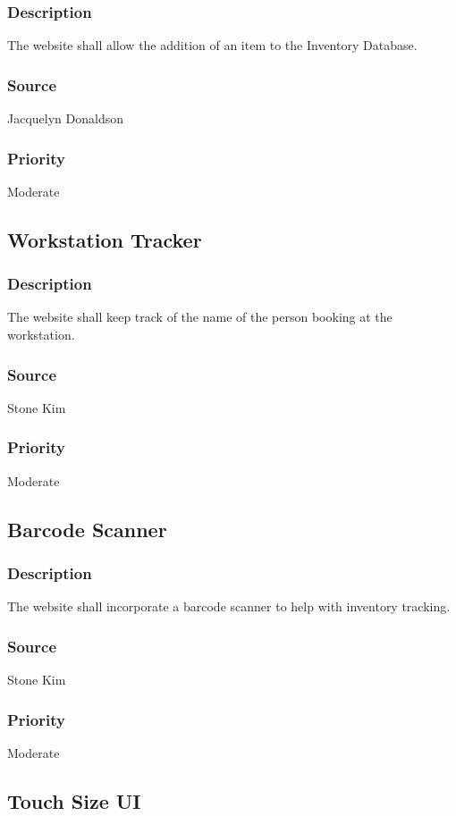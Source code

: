 \subsubsection{Description}
The website shall allow the addition of an item to the Inventory Database.
\subsubsection{Source}
Jacquelyn Donaldson
\subsubsection{Priority}
Moderate

\subsection{Workstation Tracker}
\subsubsection{Description}
The website shall keep track of the name of the person booking at the workstation.
\subsubsection{Source}
Stone Kim
\subsubsection{Priority}
Moderate

\subsection{Barcode Scanner}
\subsubsection{Description}
The website shall incorporate a barcode scanner to help with inventory tracking.
\subsubsection{Source}
Stone Kim
\subsubsection{Priority}
Moderate

\subsection{Touch Size UI}
